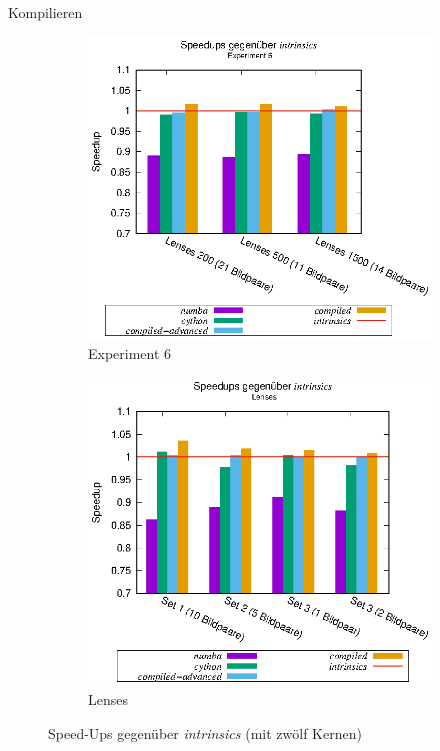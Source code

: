 \begin{frame}{Kompilieren}
	\begin{figure}[h]
		\begin{subfigure}[b]{0.47\textwidth}
			\centering
			\includegraphics[width=\textwidth]{pdf/speedups_exp6}
			\caption{Experiment 6}
		\end{subfigure}
		\hfill
		\begin{subfigure}[b]{0.47\textwidth}
			\centering
			\includegraphics[width=\textwidth]{pdf/speedups_lenses}
			\caption{Lenses}
		\end{subfigure}
		\caption{Speed-Ups gegenüber \textit{intrinsics} (mit zwölf Kernen)}
	\end{figure}
\end{frame}

